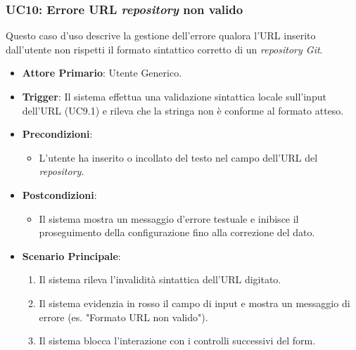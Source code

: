 \documentclass[12pt, a4paper]{article}
\begin{document}
\subsubsection{UC10: Errore URL \textit{repository} non valido}\label{uc:10}
Questo caso d'uso descrive la gestione dell'errore qualora l'URL inserito dall'utente non rispetti il formato sintattico corretto di un \textit{repository Git}.
\begin{itemize}
    \item \textbf{Attore Primario}: Utente Generico.
    \item \textbf{Trigger}: Il sistema effettua una validazione sintattica locale sull'input dell'URL (UC9.1) e rileva che la stringa non è conforme al formato atteso.
    \item \textbf{Precondizioni}:\begin{itemize}\item L'utente ha inserito o incollato del testo nel campo dell'URL del \textit{repository}.\end{itemize}
    \item \textbf{Postcondizioni}:\begin{itemize}\item Il sistema mostra un messaggio d'errore testuale e inibisce il proseguimento della configurazione fino alla correzione del dato.\end{itemize}
    \item \textbf{Scenario Principale}:
    \begin{enumerate}
        \item Il sistema rileva l'invalidità sintattica dell'URL digitato.
        \item Il sistema evidenzia in rosso il campo di input e mostra un messaggio di errore (es. "Formato URL non valido").
        \item Il sistema blocca l'interazione con i controlli successivi del form.
    \end{enumerate}
\end{itemize}
\end{document}
